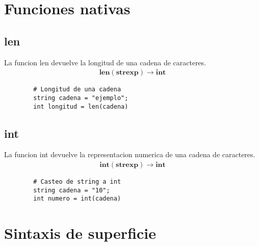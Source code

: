 \documentclass{article}
\begin{document}
    \newpage
    \section{Funciones nativas}
    \subsection{len}
    La funcion len devuelve la longitud de una cadena de caracteres.
    \begin{align} 
        \textbf{len}( \textbf{strexp} ) \rightarrow \textbf{int}
    \end{align}
    \begin{lstlisting}
        # Longitud de una cadena
        string cadena = "ejemplo";
        int longitud = len(cadena)
    \end{lstlisting}
    \subsection{int}
    La funcion int devuelve la representacion numerica de una cadena de caracteres.
    \begin{align} 
        \textbf{int}( \textbf{strexp} ) \rightarrow \textbf{int}
    \end{align}
    \begin{lstlisting}
        # Casteo de string a int
        string cadena = "10";
        int numero = int(cadena)
    \end{lstlisting}
    \section{Sintaxis de superficie}
\end{document}
